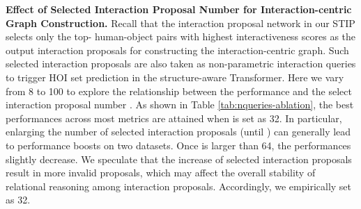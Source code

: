 \documentclass[10pt,twocolumn,letterpaper]{article}
\begin{document}
\begin{table}[!tb]
\begin{center}
\vspace{-0.22in}
\end{center}
\vspace{-0.2in}
\caption{Performance comparison by using different number of selected interaction proposals () for interaction-centric graph construction in our STIP.}
\label{tab:nqueries-ablation}
\vspace{-0.25in}
\end{table}


\textbf{Effect of Selected Interaction Proposal Number  for Interaction-centric Graph Construction.}
Recall that the interaction proposal network in our STIP selects only the top- human-object pairs with highest interactiveness scores as the output interaction proposals for constructing the interaction-centric graph. Such  selected interaction proposals are also taken as non-parametric interaction queries to trigger HOI set prediction in the structure-aware Transformer. Here we vary  from 8 to 100 to explore the relationship between the performance and the select interaction proposal number . As shown in Table \ref{tab:nqueries-ablation}, the best performances across most metrics are attained when  is set as 32. In particular, enlarging the number of selected interaction proposals (until ) can generally lead to performance boosts on two datasets. Once  is larger than 64, the performances slightly decrease. We speculate that the increase of selected interaction proposals result in more invalid proposals, which may affect the overall stability of relational reasoning among interaction proposals. Accordingly, we empirically set  as 32.
\end{document}
